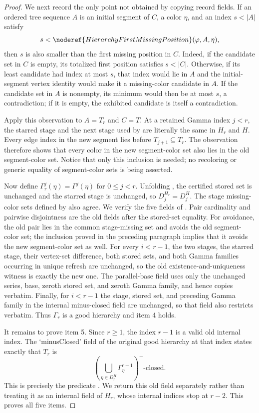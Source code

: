 \begin{proof}
We next record the only point not obtained by copying record fields.  If an
ordered tree sequence $A$ is an initial segment of $C$, a color $\eta$, and
an index $s<|A|$ satisfy
\[
 s<\noderef{HierarchyFirstMissingPosition}(\varphi,A,\eta),
\]
then $s$ is also smaller than the first missing position in $C$.  Indeed,
if the candidate set in $C$ is empty, its totalized first position satisfies
$s<|C|$.  Otherwise, if its least candidate had index at most $s$, that
index would lie in $A$ and the initial-segment vertex identity would make
it a missing-color candidate in $A$.  If the candidate set in $A$ is
nonempty, its minimum would then be at most $s$, a contradiction; if it is
empty, the exhibited candidate is itself a contradiction.

Apply this observation to $A=T_r$ and $C=T$.  At a retained Gamma index
$j<r$, the starred stage and the next stage used by
 are literally the same in $H_r$ and $H$.
Every edge index in the new segment lies before $T_{j+1}\subseteq T_r$.
The observation therefore shows that every color in the new segment-color
set also lies in the old segment-color set.  Notice that only this inclusion
is needed; no recoloring or generic equality of segment-color sets is being
asserted.

Now define $\Gamma_r^j(\eta)=\Gamma^j(\eta)$ for $0\leq j<r$.  Unfolding
, the certified stored set is unchanged
and the starred stage is unchanged, so $D^{H_r}_j=D^H_j$.  The stage
missing-color sets defined by  also
agree.  We verify the five fields of
.  Pair cardinality and pairwise disjointness are
the old fields after the stored-set equality.  For avoidance, the old pair
lies in the common stage-missing set and avoids the old segment-color set;
the inclusion proved in the preceding paragraph implies that it avoids the
new segment-color set as well.  For every $i<r-1$, the two stages, the
starred stage, their vertex-set difference, both stored sets, and both
Gamma families occurring in unique refresh are unchanged, so the old
existence-and-uniqueness witness is exactly the new one.  The parallel-base
field uses only the unchanged series, base, zeroth stored set, and zeroth
Gamma family, and hence copies verbatim.  Finally, for $i<r-1$ the stage,
stored set, and preceding Gamma family in the internal minus-closed field
are unchanged, so that field also restricts verbatim.  Thus $\Gamma_r$ is a
good hierarchy and item 4 holds.

It remains to prove item 5.  Since $r\geq1$, the index $r-1$ is a valid old
internal index.  The `minusClosed' field of the original good hierarchy at
that index states exactly that $T_r$ is
\[
 \left(\bigcup_{\eta\in D^H_r}\Gamma^{r-1}_\eta\right)^{-}
\text{-closed}.
\]
This is precisely the predicate .
We return this old field separately rather than treating it as an internal
field of $H_r$, whose internal indices stop at $r-2$.  This proves all five
items.
\end{proof}
